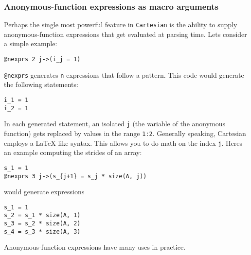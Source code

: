 \hypertarget{10509900364879728464}{}


\subsubsection{Anonymous-function expressions as macro arguments}



Perhaps the single most powerful feature in \texttt{Cartesian} is the ability to supply anonymous-function expressions that get evaluated at parsing time.  Let{\textquotesingle}s consider a simple example:




\begin{verbatim}
@nexprs 2 j->(i_j = 1)
\end{verbatim}



\texttt{@nexprs} generates \texttt{n} expressions that follow a pattern. This code would generate the following statements:




\begin{verbatim}
i_1 = 1
i_2 = 1
\end{verbatim}



In each generated statement, an {\textquotedbl}isolated{\textquotedbl} \texttt{j} (the variable of the anonymous function) gets replaced by values in the range \texttt{1:2}. Generally speaking, Cartesian employs a LaTeX-like syntax.  This allows you to do math on the index \texttt{j}.  Here{\textquotesingle}s an example computing the strides of an array:




\begin{verbatim}
s_1 = 1
@nexprs 3 j->(s_{j+1} = s_j * size(A, j))
\end{verbatim}



would generate expressions




\begin{verbatim}
s_1 = 1
s_2 = s_1 * size(A, 1)
s_3 = s_2 * size(A, 2)
s_4 = s_3 * size(A, 3)
\end{verbatim}



Anonymous-function expressions have many uses in practice.



\hypertarget{908996570436533510}{}


